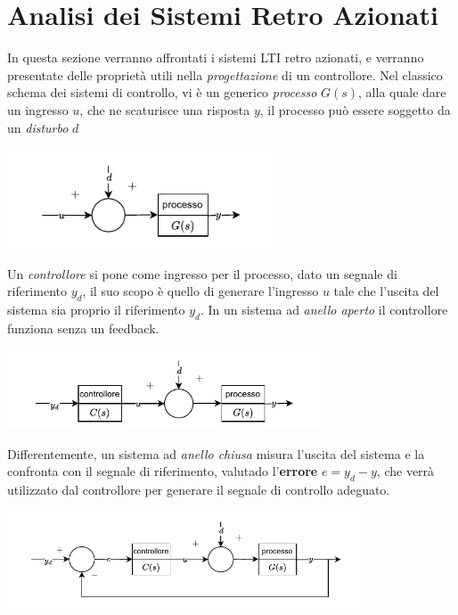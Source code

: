 \documentclass[10pt, letterpaper]{report}
\begin{document}
 \section{Analisi dei Sistemi Retro Azionati}
 In questa sezione verranno affrontati i sistemi LTI retro azionati, e verranno presentate delle proprietà utili nella \textit{progettazione} di un controllore. \acc 
 Nel classico schema dei sistemi di controllo, vi è un generico \textit{processo} $G(s)$, alla quale dare un ingresso $u$, che ne scaturisce una risposta $y$, il processo può essere soggetto da un \textit{disturbo} $d$
 \begin{center}
    \includegraphics[width=0.6\textwidth ]{images/classicoControllo.pdf}
 \end{center}
Un \textit{controllore} si pone come ingresso per il processo, dato un segnale di riferimento $y_d$, il suo scopo è quello di generare l'ingresso $u$ tale che l'uscita del sistema sia proprio il riferimento $y_d$. In un sistema ad \textit{anello aperto} il controllore funziona senza un feedback.
\begin{center}
    \includegraphics[width=0.7\textwidth ]{images/classicoControllo2.pdf}
 \end{center}
Differentemente, un sistema ad \textit{anello chiusa} misura l'uscita del sistema e la confronta con il segnale di riferimento, valutado l'\textbf{errore} $e=y_d-y$, che verrà utilizzato dal controllore per generare il segnale di controllo adeguato.
\begin{center}
    \includegraphics[width=0.8\textwidth ]{images/classicoControllo3.pdf}
 \end{center}
\end{document}
